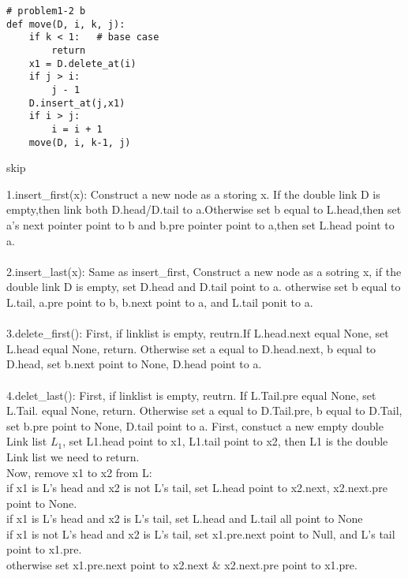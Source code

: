 \documentclass[12pt,twoside]{article}
\begin{document}
\begin{problems}
\begin{problemparts}
\problempart %

\begin{lstlisting}
# problem1-2 b
def move(D, i, k, j):
    if k < 1:   # base case
        return
    x1 = D.delete_at(i)
    if j > i:
        j - 1
    D.insert_at(j,x1)
    if i > j:
        i = i + 1
    move(D, i, k-1, j)
\end{lstlisting}

\end{problemparts}

\newpage
\problem  %
skip
\newpage
\problem  %

\begin{problemparts}
\problempart %

1.insert\_first(x): Construct a new node as a storing x. If the double link D is empty,then link both
D.head/D.tail to a.Otherwise set b equal to L.head,then
set a's next pointer point to b and b.pre pointer point to a,then set L.head point to a. 
\\ \\
2.insert\_last(x): Same as insert\_first, Construct a new node as a sotring x, if the
double link D is empty, set D.head and D.tail point to a.
otherwise set b equal to L.tail, a.pre point to b, b.next point to a, and L.tail ponit to a.
\\ \\
3.delete\_first(): First, if linklist is empty, reutrn.If L.head.next equal None, set L.head equal None, return.
Otherwise set a equal to D.head.next,
b equal to D.head, set b.next point to None, D.head point to a.
\\ \\
4.delet\_last(): First, if linklist is empty, reutrn. If L.Tail.pre equal None, set L.Tail. equal None, return.
Otherwise set a equal to D.Tail.pre,
b equal to D.Tail, set b.pre point to None, D.tail point to a.
\problempart %
First, constuct a new empty double Link list $L_1$, set L1.head point to x1,
L1.tail point to x2, then L1 is the double Link list we need to return. \\
Now, remove x1 to x2 from L:\\
if x1 is L's head and x2 is not L's tail, set L.head point to x2.next, x2.next.pre point to None. \\
if x1 is L's head and x2 is L's tail, set L.head and L.tail all point to None \\
if x1 is not L's head and x2 is L's tail, set x1.pre.next point to Null, and L's tail point to x1.pre. \\
otherwise set x1.pre.next point to x2.next \& x2.next.pre point to x1.pre.


\end{problemparts}
\end{problems}
\end{document}
